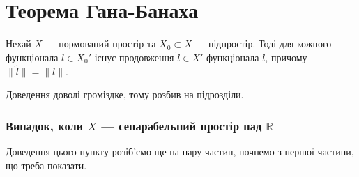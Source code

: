 \documentclass{math_library}
\begin{document}
\section{Теорема Гана-Банаха}

\begin{theorem}
Нехай $X$ --- нормований простір та $X_0 \subset X$ --- підпростір. Тоді для кожного функціонала $l \in X_0'$ існує продовження $\tilde{l} \in X'$ функціонала $l$, причому $\| \tilde{l} \| = \|l\|$.
\end{theorem}

Доведення доволі громіздке, тому розбив на підрозділи.

\subsubsection{Випадок, коли $X$ --- сепарабельний простір над $\mathbb{R}$}
Доведення цього пункту розіб'ємо ще на пару частин, почнемо з першої частини, що треба показати.
\end{document}
